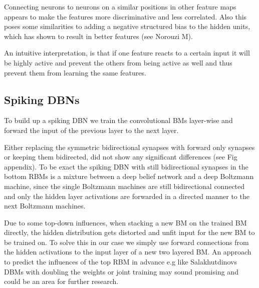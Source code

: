 Connecting neurons to neurons on a similar positions in other feature maps appears to make the features more discriminative and less correlated.
Also this poses some similarities to adding a negative structured bias to the hidden units, which has shown to result in better features (see Norouzi M).

An intuitive interpretation, is that if one feature reacts to a certain input it will be highly active and prevent the others from being active as well and thus prevent them from learning the same features.  

\subsection{Spiking DBNs}

To build up a spiking DBN we train the convolutional BMs layer-wise and forward the input of the previous layer to the next layer.

Either replacing the symmetric bidirectional synapses with forward only synapses or keeping them bidirected, did not show any significant differences (see Fig appendix). 
To be exact the spiking DBN with still bidirectional synapses in the bottom RBMs is a mixture between a deep belief network and a deep Boltzmann machine, since the single Boltzmann machines are still bidirectional connected and only the hidden layer activations are forwarded in a directed manner to the next Boltzmann machines.

Due to some top-down influences, when stacking a new BM  on the trained BM directly, the hidden distribution gets distorted and unfit input for the new BM to be trained on. 
To solve this in our case we simply use forward connections from the hidden activations to the input layer of a new two layered BM. 
An approach to predict the influences of the top RBM in advance e.g like Salakhutdinovs DBMs with doubling the weights or joint training may sound promising and could be an area for further research.

